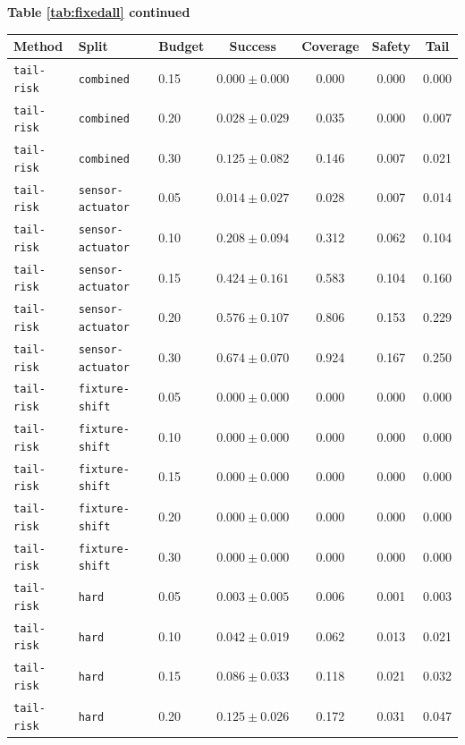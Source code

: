 \documentclass{article}
\begin{document}
\begin{center}
\textbf{Table \ref{tab:fixedall} continued}\\[0.4ex]
\begin{tabular}{lllcccc}
\toprule
Method & Split & Budget & Success & Coverage & Safety & Tail \\
\midrule
\texttt{tail-risk} & \texttt{combined} & 0.15 & $0.000 \pm 0.000$ & 0.000 & 0.000 & 0.000 \\
\texttt{tail-risk} & \texttt{combined} & 0.20 & $0.028 \pm 0.029$ & 0.035 & 0.000 & 0.007 \\
\texttt{tail-risk} & \texttt{combined} & 0.30 & $0.125 \pm 0.082$ & 0.146 & 0.007 & 0.021 \\
\texttt{tail-risk} & \texttt{sensor-actuator} & 0.05 & $0.014 \pm 0.027$ & 0.028 & 0.007 & 0.014 \\
\texttt{tail-risk} & \texttt{sensor-actuator} & 0.10 & $0.208 \pm 0.094$ & 0.312 & 0.062 & 0.104 \\
\texttt{tail-risk} & \texttt{sensor-actuator} & 0.15 & $0.424 \pm 0.161$ & 0.583 & 0.104 & 0.160 \\
\texttt{tail-risk} & \texttt{sensor-actuator} & 0.20 & $0.576 \pm 0.107$ & 0.806 & 0.153 & 0.229 \\
\texttt{tail-risk} & \texttt{sensor-actuator} & 0.30 & $0.674 \pm 0.070$ & 0.924 & 0.167 & 0.250 \\
\texttt{tail-risk} & \texttt{fixture-shift} & 0.05 & $0.000 \pm 0.000$ & 0.000 & 0.000 & 0.000 \\
\texttt{tail-risk} & \texttt{fixture-shift} & 0.10 & $0.000 \pm 0.000$ & 0.000 & 0.000 & 0.000 \\
\texttt{tail-risk} & \texttt{fixture-shift} & 0.15 & $0.000 \pm 0.000$ & 0.000 & 0.000 & 0.000 \\
\texttt{tail-risk} & \texttt{fixture-shift} & 0.20 & $0.000 \pm 0.000$ & 0.000 & 0.000 & 0.000 \\
\texttt{tail-risk} & \texttt{fixture-shift} & 0.30 & $0.000 \pm 0.000$ & 0.000 & 0.000 & 0.000 \\
\texttt{tail-risk} & \texttt{hard} & 0.05 & $0.003 \pm 0.005$ & 0.006 & 0.001 & 0.003 \\
\texttt{tail-risk} & \texttt{hard} & 0.10 & $0.042 \pm 0.019$ & 0.062 & 0.013 & 0.021 \\
\texttt{tail-risk} & \texttt{hard} & 0.15 & $0.086 \pm 0.033$ & 0.118 & 0.021 & 0.032 \\
\texttt{tail-risk} & \texttt{hard} & 0.20 & $0.125 \pm 0.026$ & 0.172 & 0.031 & 0.047 \\

\end{tabular}
\end{center}
\end{document}
